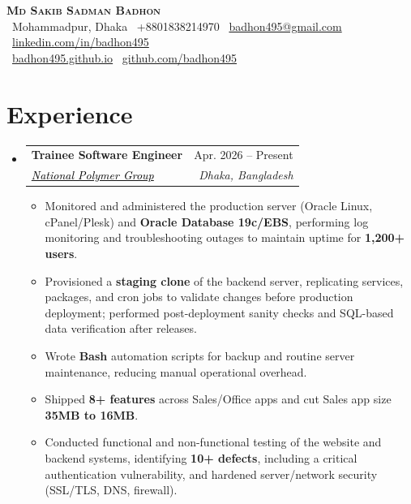 \documentclass[a4paper]{article}
\makeatletter
\newcommand{\resumeItem}[1]{
  \item\small{
    {#1 \vspace{-2pt}}
  }
}
\newcommand{\resumeSubheading}[4]{
  \vspace{-2pt}\item
    \begin{tabular*}{0.97\textwidth}[t]{l@{\extracolsep{\fill}}r}
      \textbf{#1} & #2 \\
      \textit{\small#3} & \textit{\small #4} \\
    \end{tabular*}\vspace{-7pt}
}
\newcommand{\resumeSubHeadingListStart}{\begin{itemize}[leftmargin=0.15in, label={}]}
\newcommand{\resumeSubHeadingListEnd}{\end{itemize}}
\newcommand{\resumeItemListStart}{\begin{itemize}}
\newcommand{\resumeItemListEnd}{\end{itemize}\vspace{-5pt}}
\makeatother
\begin{document}
\begin{center}
    \textbf{\Huge \scshape Md Sakib Sadman Badhon} \\ \vspace{4pt}
    \faMapMarker*~Mohammadpur, Dhaka \enspace
    ~+8801838214970 \enspace
    \faEnvelope~\href{mailto:badhon495@gmail.com}{badhon495@gmail.com} \enspace
    \faLinkedin~\href{https://linkedin.com/in/badhon495/}{linkedin.com/in/badhon495} \\ \vspace{4pt}
    \faGlobe~\href{https://badhon495.github.io/}{badhon495.github.io} \enspace
    \faGithub~\href{https://github.com/badhon495}{github.com/badhon495} \enspace
\end{center}


\section{Experience}
  \resumeSubHeadingListStart

    \resumeSubheading
      {Trainee Software Engineer}{Apr. 2026 -- Present}
      {\href{https://www.nationalpolymer.net/}{\textcolor{black}{National Polymer Group}}}{Dhaka, Bangladesh}
      \resumeItemListStart
        \resumeItem{Monitored and administered the production server (Oracle Linux, cPanel/Plesk) and \textbf{Oracle Database 19c/EBS}, performing log monitoring and troubleshooting outages to maintain uptime for \textbf{1,200+ users}.}
        \resumeItem{Provisioned a \textbf{staging clone} of the backend server, replicating services, packages, and cron jobs to validate changes before production deployment; performed post-deployment sanity checks and SQL-based data verification after releases.}
        \resumeItem{Wrote \textbf{Bash} automation scripts for backup and routine server maintenance, reducing manual operational overhead.}
        \resumeItem{Shipped \textbf{8+ features} across Sales/Office apps and cut Sales app size \textbf{35MB to 16MB}.}
        \resumeItem{Conducted functional and non-functional testing of the website and backend systems, identifying \textbf{10+ defects}, including a critical authentication vulnerability, and hardened server/network security (SSL/TLS, DNS, firewall).}
      \resumeItemListEnd

  \resumeSubHeadingListEnd




\end{document}
